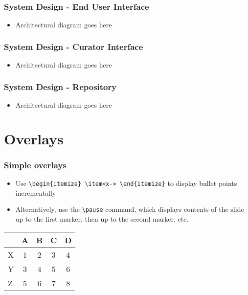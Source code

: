 \documentclass[xcolor=pdftex,t,11pt]{beamer}
\begin{document}
\begin{frame}[fragile]
\frametitle{System Design - End User Interface}
\begin{itemize}
\item Architectural diagram goes here
\end{itemize}
\begin{figure}
\end{figure}
\end{frame}

\begin{frame}[fragile]
\frametitle{System Design - Curator Interface}
\begin{itemize}
\item Architectural diagram goes here
\end{itemize}
\begin{figure}
\end{figure}
\end{frame}

\begin{frame}[fragile]
\frametitle{System Design - Repository}
\begin{itemize}
\item Architectural diagram goes here
\end{itemize}
\begin{figure}
\end{figure}
\end{frame}


\section{Overlays}


\begin{frame}[fragile]
\frametitle{Simple overlays}
\begin{itemize}
\item<1-> Use \verb!\begin{itemize} \item<x-> \end{itemize}! to display bullet points incrementally
\item<2-> Alternatively, use the \verb!\pause! command, which displays contents of the slide up to the first marker, then up to the second marker, etc.
\end{itemize}
\pause
\begin{table}
\begin{tabular}{lcccc}
        & A & B & C & D \\\hline
  X     & 1 & 2 & 3 & 4 \pause\\
  Y     & 3 & 4 & 5 & 6 \pause\\
  Z     & 5 & 6 & 7 & 8
\end{tabular}
\end{table}
\end{frame}
\end{document}
